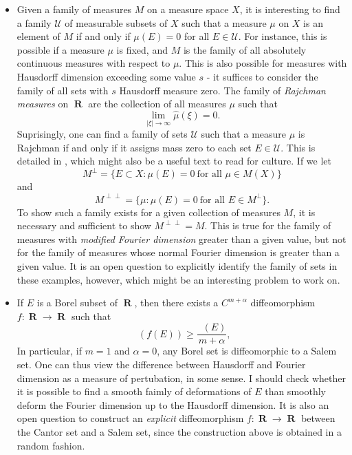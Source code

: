 \documentclass[openany,nobib,nols,a4paper,twoside,symmetric,justified,notoc]{tufte-book}
\theoremstyle{plain}
\theoremstyle{remark}
\theoremstyle{definition}
\DeclareMathOperator{\RR}{\mathbf{R}}
\DeclareMathOperator{\fordim}{\text{dim}_{\mathbf{F}}}
\DeclareMathOperator{\hausdim}{\text{dim}_{\mathbf{H}}}
\begin{document}
\begin{itemize}
    \item Given a family of measures $M$ on a measure space $X$, it is interesting to find a family $\mathcal{U}$ of measurable subsets of $X$ such that a measure $\mu$ on $X$ is an element of $M$ if and only if $\mu(E) = 0$ for all $E \in \mathcal{U}$. For instance, this is possible if a measure $\mu$ is fixed, and $M$ is the family of all absolutely continuous measures with respect to $\mu$. This is also possible for measures with Hausdorff dimension exceeding some value $s$ - it suffices to consider the family of all sets with $s$ Hausdorff measure zero. The family of \emph{Rajchman measures} on $\RR$ are the collection of all measures $\mu$ such that
    \[ \lim_{|\xi| \to \infty} \widehat{\mu}(\xi) = 0. \]
    Suprisingly, one can find a family of sets $\mathcal{U}$ such that a measure $\mu$ is Rajchman if and only if it assigns mass zero to each set $E \in \mathcal{U}$. This is detailed in \cite{Lyons1995}, which might also be a useful text to read for culture. If we let
    \[ M^\perp = \{ E \subset X: \mu(E) = 0\ \text{for all $\mu \in M(X)$} \} \]
    and
    \[ M^{\perp \perp} = \{ \mu : \mu(E) = 0\ \text{for all $E \in M^\perp$} \}. \]
    To show such a family exists for a given collection of measures $M$, it is necessary and sufficient to show $M^{\perp \perp} = M$. This is true for the family of measures with \emph{modified Fourier dimension} greater than a given value, but not for the family of measures whose normal Fourier dimension is greater than a given value. It is an open question to explicitly identify the family of sets in these examples, however, which might be an interesting problem to work on.

    \item If $E$ is a Borel subset of $\RR$, then there exists a $C^{m + \alpha}$ diffeomorphism $f: \RR \to \RR$ such that
    \[ \fordim(f(E)) \geq \frac{\hausdim(E)}{m + \alpha}, \]
    In particular, if $m = 1$ and $\alpha = 0$, any Borel set is diffeomorphic to a Salem set. One can thus view the difference between Hausdorff and Fourier dimension as a measure of pertubation, in some sense. I should check whether it is possible to find a smooth faimly of deformations of $E$ than smoothly deform the Fourier dimension up to the Hausdorff dimension. It is also an open question to construct an \emph{explicit} diffeomorphism $f: \RR \to \RR$ between the Cantor set and a Salem set, since the construction above is obtained in a random fashion.
\end{itemize}
\end{document}
